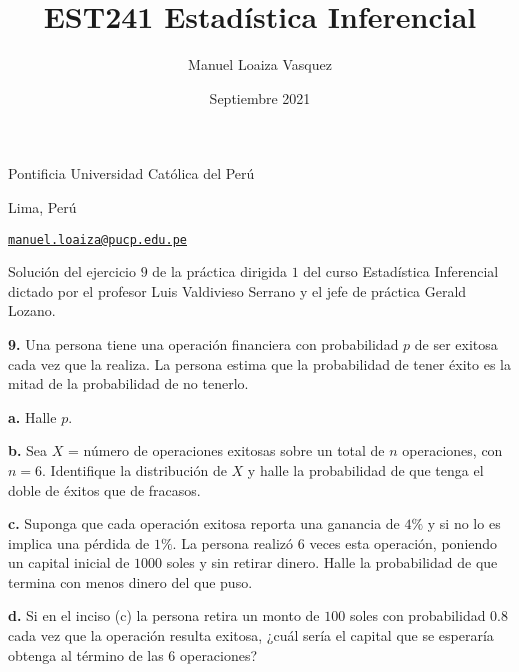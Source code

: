 \documentclass{article}
\title{EST241 Estad\'istica Inferencial}
\author{Manuel Loaiza Vasquez}
\date{Septiembre 2021}
\newenvironment{statement}[1]{\smallskip\noindent\color[rgb]{1.00,0.00,0.50} {\bf #1.}}{}
\theoremstyle{definition}
\theoremstyle{remark}
\begin{document}
\maketitle

\vspace*{-0.25in}
\centerline{Pontificia Universidad Cat\'olica del Per\'u}
\centerline{Lima, Per\'u}
\centerline{\href{mailto:manuel.loaiza@pucp.edu.pe}{{\tt manuel.loaiza@pucp.edu.pe}}}
\vspace*{0.15in}

\begin{framed}
  Soluci\'on del ejercicio $9$ de la pr\'actica dirigida $1$ del curso
  Estad\'istica Inferencial dictado por el profesor Luis Valdivieso Serrano
  y el jefe de pr\'actica Gerald Lozano.
\end{framed}

\begin{statement}{9}
  Una persona tiene una operaci\'on financiera con probabilidad $p$ de ser
  exitosa cada vez que la realiza. La persona estima que la probabilidad de
  tener \'exito es la mitad de la probabilidad de no tenerlo.
\end{statement}

\begin{statement}{a}
  Halle $p$.
\end{statement}

\begin{statement}{b}
  Sea $X$ = n\'umero de operaciones exitosas sobre un total de $n$ operaciones,
  con $n = 6$. Identifique la distribuci\'on de $X$ y halle la probabilidad de
  que tenga el doble de \'exitos que de fracasos.
\end{statement}

\begin{statement}{c}
  Suponga que cada operaci\'on exitosa reporta una ganancia de $4\%$ y si no
  lo es implica una p\'erdida de $1\%$. La persona realiz\'o $6$ veces esta
  operaci\'on, poniendo un capital inicial de $1000$ soles y sin retirar dinero.
  Halle la probabilidad de que termina con menos dinero del que puso.
\end{statement}

\begin{statement}{d}
  Si en el inciso (c) la persona retira un monto de $100$ soles con probabilidad
  $0.8$ cada vez que la operaci\'on resulta exitosa, ¿cu\'al ser\'ia el
  capital que se esperar\'ia obtenga al t\'ermino de las $6$ operaciones?
\end{statement}
\end{document}
